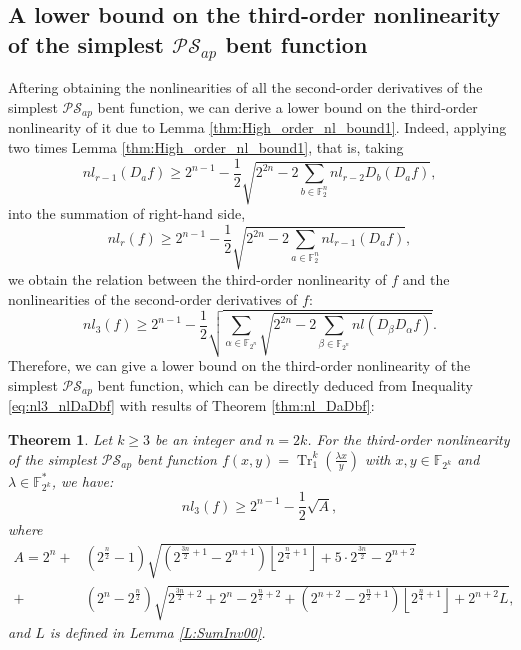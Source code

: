\documentclass{article}
\newcommand{\F}{\mathbb{F}}
\newcommand{\0}{\textbf{0}}
\newcommand{\1}{\textbf{1}}
\newcommand{\TRACE}{\operatorname{Tr}_1^k}
\theoremstyle{plain}
\newtheorem{theorem}{Theorem}
\begin{document}
\subsection{A lower bound on the third-order nonlinearity of the simplest $\mathcal{PS}_{ap}$ bent function}
    Aftering obtaining the nonlinearities of all the second-order derivatives of the simplest $\mathcal{PS}_{ap}$ bent function, we can derive a lower bound on the third-order nonlinearity of it due to Lemma \ref{thm:High_order_nl_bound1}. 
    Indeed, applying two times Lemma \ref{thm:High_order_nl_bound1}, that is, taking  
    \[nl_{r-1}(D_af) \ge 2^{n-1}-\frac{1}{2}\sqrt{2^{2n}-2\sum_{b\in\F_2^n}nl_{r-2}D_b(D_af)},\]
    into the summation  of right-hand side, 
    \[nl_r(f) \ge 2^{n-1}-\frac{1}{2}\sqrt{2^{2n}-2\sum_{a\in\F_2^n}nl_{r-1}(D_af)},\]
    we obtain the relation between the third-order nonlinearity of $f$ and the nonlinearities of the second-order derivatives of $f$:
    \begin{equation}\label{eq:nl3_nlDaDbf}
        nl_3(f)\ge 2^{n-1}-\frac{1}{2}\sqrt{\sum_{\alpha\in\F_{2^n}}\sqrt{2^{2n}-2\sum_{\beta\in\F_{2^n}} nl(D_{\beta}D_{\alpha}f)}}. 
    \end{equation}
    Therefore, we can give a lower bound on the third-order nonlinearity of the simplest $\mathcal{PS}_{ap}$ bent function, which can be directly deduced from Inequality \eqref{eq:nl3_nlDaDbf} with results of Theorem \ref{thm:nl_DaDbf}:   
    \begin{theorem}\label{th:our_lower_bound}
        Let $k\ge 3$ be an integer and $n=2k$. For the third-order nonlinearity of the simplest $\mathcal{PS}_{ap}$ bent function $f(x,y)=\TRACE(\frac{\lambda x}{y})$ with $x,y\in\F_{2^k}$ and $\lambda\in\F_{2^k}^*$, we have:
        \[nl_3(f)\ge 2^{n-1}-\frac{1}{2}\sqrt{A},\]
        where 
        \begin{align*}
            A=2^n+&(2^{\frac{n}{2}}-1)\sqrt{(2^{\frac{3n}{2}+1}-2^{n+1})\left\lfloor 2^{\frac{n}{4}+1}\right\rfloor+5\cdot 2^{\frac{3n}{2}}-2^{n+2}}\\
            +&(2^n-2^{\frac{n}{2}})\sqrt{2^{\frac{3n}{2}+2}+2^n-2^{\frac{n}{2}+2}+(2^{n+2}-2^{\frac{n}{2}+1})\left\lfloor 2^{\frac{n}{4}+1}\right\rfloor+2^{n+2}L},
        \end{align*}
        and $L$ is defined in Lemma \ref{L:SumInv00}. 
    \end{theorem}
\end{document}
